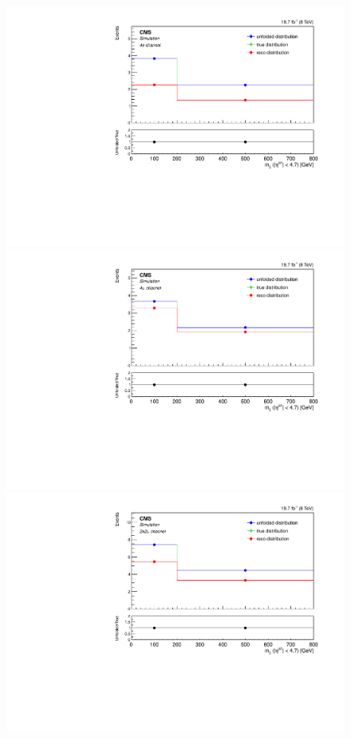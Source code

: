 \begin{figure}[hbtp]
\begin{center}
     \includegraphics[width=0.8\cmsFigWidth]{Figures/Unfolding/MCTests/Mjj_ZZTo4e_PowMatrix_PowDistr_FullSample_fr}     
    \includegraphics[width=0.8\cmsFigWidth]{Figures/Unfolding/MCTests/Mjj_ZZTo4m_PowMatrix_PowDistr_FullSample_fr}     
    \includegraphics[width=0.8\cmsFigWidth]{Figures/Unfolding/MCTests/Mjj_ZZTo2e2m_PowMatrix_PowDistr_FullSample_fr}      

\end{center}
\end{figure}
